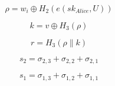 \documentclass[11pt]{report}
\begin{document}
\begin{equation}
\rho = w_i \oplus H_2 \left( e \left( sk_{Alice}, U \right) \right)
\end{equation}

\begin{equation}
k = v \oplus H_3 \left( \rho \right)
\end{equation}

\begin{equation}
r = H_3 \left( \rho \parallel k \right)
\end{equation}

\begin{equation}
s_2 = \sigma_{2,3} + \sigma_{2,2} + \sigma_{2,1}
\end{equation}

\begin{equation}
s_1 = \sigma_{1,3} + \sigma_{1,2} + \sigma_{1,1}
\end{equation}
\end{document}
